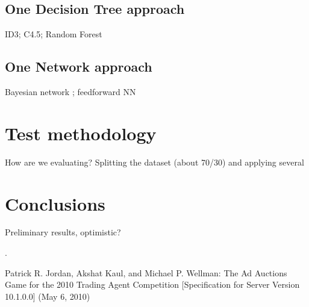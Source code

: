 \documentclass{llncs}
\begin{document}
\subsection{One Decision Tree approach}
ID3; C4.5; Random Forest

\subsection{One Network approach}
Bayesian network ; feedforward NN



\section{Test methodology}
How are we evaluating? Splitting the dataset (about 70/30) and applying several 

\section{Conclusions}
Preliminary results, optimistic? 


%
%
.
\begin{thebibliography}{}
%
Patrick R. Jordan, Akshat Kaul, and Michael P. Wellman:
The Ad Auctions Game
for the 2010 Trading Agent Competition
[Specification for Server Version 10.1.0.0]
(May 6, 2010)
\end{thebibliography}
\end{document}
